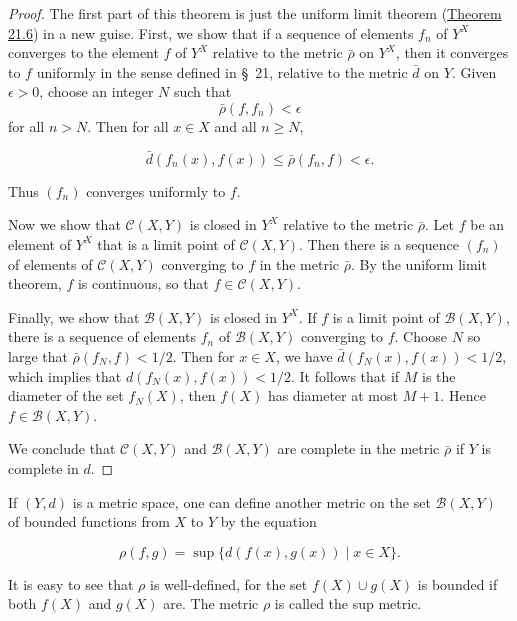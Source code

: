 \begin{proof}
The first part of this theorem is just the uniform limit theorem (\hyperref[thm:21.6]{Theorem 21.6}) in a new guise. First, we show that if a sequence of elements \(f_{n}\) of \(Y^{X}\) converges to the element \(f\) of \(Y^{X}\) relative to the metric \(\bar{\rho }\) on \(Y^{X}\), then it converges to \(f\) uniformly in the sense defined in \S\ 21, relative to the metric \(\bar{d}\) on \(Y\). Given \(\epsilon > 0\), choose an integer \(N\) such that
\[
\bar{\rho }({f,f_{n}}) < \epsilon
\]
for all \(n > N\). Then for all \(x \in X\) and all \(n \geq N\),

\[
\bar{d}({f_{n}(x),f(x) }) \leq \bar{\rho }({f_{n},f}) < \epsilon .
\]

Thus \((f_{n})\) converges uniformly to \(f\).

Now we show that \(\mathcal{C}({X,Y})\) is closed in \(Y^{X}\) relative to the metric \(\bar{\rho }\). Let \(f\) be an element of \(Y^{X}\) that is a limit point of \(\mathcal{C}({X,Y})\). Then there is a sequence \((f_{n})\) of elements of \(\mathcal{C}({X,Y})\) converging to \(f\) in the metric \(\bar{\rho }\). By the uniform limit theorem, \(f\) is continuous, so that \(f \in \mathcal{C}({X,Y})\).

Finally, we show that \(\mathcal{B}({X,Y})\) is closed in \(Y^{X}\). If \(f\) is a limit point of \(\mathcal{B}({X,Y})\), there is a sequence of elements \(f_{n}\) of \(\mathcal{B}({X,Y})\) converging to \(f\). Choose \(N\) so large that \(\bar{\rho }({f_{N},f}) < 1/2\). Then for \(x \in X\), we have \(\bar{d}({f_{N}(x),f(x) }) < 1/2\), which implies that \(d({f_{N}(x),f(x) }) < 1/2\). It follows that if \(M\) is the diameter of the set \(f_{N}(X)\), then \(f(X)\) has diameter at most \(M + 1\). Hence \(f \in \mathcal{B}({X,Y})\).

We conclude that \(\mathcal{C}({X,Y})\) and \(\mathcal{B}({X,Y})\) are complete in the metric \(\bar{\rho }\) if \(Y\) is complete in \(d\).
\end{proof}
\begin{definition}
If \((Y, d)\) is a metric space, one can define another metric on the set \(\mathcal{B}({X,Y})\) of bounded functions from \(X\) to \(Y\) by the equation

\[
\rho ({f,g}) = \sup \{ d({f(x),g(x) }) \mid x \in X\}.
\]

It is easy to see that \(\rho\) is well-defined, for the set \(f(X) \cup g(X)\) is bounded if both \(f(X)\) and \(g(X)\) are. The metric \(\rho\) is called the sup metric.
\end{definition}

